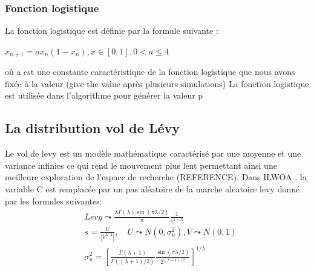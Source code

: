 \documentclass[12pt]{article}
\begin{document}
\subsubsection{Fonction logistique}
La fonction logistique est définie par la formule suivante :
\newline
\begin{center}
    $x_{n+1}=ax_n(1-x_n) ,x\in[0,1],0<a\leq4$   
\end{center}
où a est une constante caractéristique de la fonction logistique que nous avons fixée à la valeur (give the value après plusieurs simulations)
La fonction logistique est utilisée dans l'algorithme pour générer la valeur p
\subsection{La distribution vol de Lévy}
Le vol de levy est un modèle mathématique caractérisé par une moyenne et une variance infinies ce qui rend le mouvement plus lent permettant ainsi une meilleure exploration de l'espace de recherche (REFERENCE).
Dans ILWOA , la variable C est remplacée par un pas aléatoire de la marche aleatoire levy donné par les formules suivantes:
\begin{align*}
&Levy\leadsto\frac{\lambda\Gamma(\lambda)\sin(\pi\lambda/2)}{\pi}\frac{1}{s^{1+\lambda}}\\
&s=\frac{U}{\left|{V^{\lambda^-1}}\right| },\quad U\leadsto N(0,\sigma_u^2),V\leadsto N(0,1)\\
&\sigma_u^2=[\frac{\Gamma(\lambda+1)}{\Gamma((\lambda+1)/2)}\frac{\sin(\pi\lambda/2)}{2^{(\lambda-1)/2}}]^{1/\lambda}
\end{align*}
\end{document}
